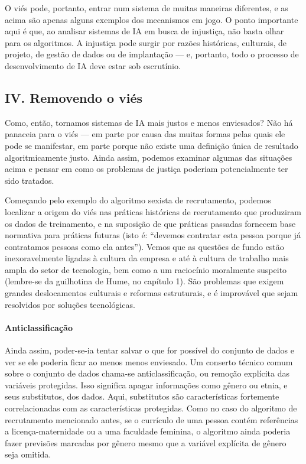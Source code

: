 \documentclass[
  11pt,
]{article}
\begin{document}
O viés pode, portanto, entrar num sistema de muitas maneiras diferentes,
e as acima são apenas alguns exemplos dos mecanismos em jogo. O ponto
importante aqui é que, ao analisar sistemas de IA em busca de injustiça,
não basta olhar para os algoritmos. A injustiça pode surgir por razões
históricas, culturais, de projeto, de gestão de dados ou de implantação
--- e, portanto, todo o processo de desenvolvimento de IA deve estar sob
escrutínio.

\subsection{IV. Removendo o viés}\label{iv.-removendo-o-viuxe9s}

Como, então, tornamos sistemas de IA mais justos e menos enviesados? Não
há panaceia para o viés --- em parte por causa das muitas formas pelas
quais ele pode se manifestar, em parte porque não existe uma definição
única de resultado algoritmicamente justo. Ainda assim, podemos examinar
algumas das situações acima e pensar em como os problemas de justiça
poderiam potencialmente ter sido tratados.

Começando pelo exemplo do algoritmo sexista de recrutamento, podemos
localizar a origem do viés nas práticas históricas de recrutamento que
produziram os dados de treinamento, e na suposição de que práticas
passadas fornecem base normativa para práticas futuras (isto é:
``devemos contratar esta pessoa porque já contratamos pessoas como ela
antes''). Vemos que as questões de fundo estão inexoravelmente ligadas à
cultura da empresa e até à cultura de trabalho mais ampla do setor de
tecnologia, bem como a um raciocínio moralmente suspeito (lembre-se da
guilhotina de Hume, no capítulo 1). São problemas que exigem grandes
deslocamentos culturais e reformas estruturais, e é improvável que sejam
resolvidos por soluções tecnológicas.

\paragraph{Anticlassificação}\label{anticlassificauxe7uxe3o}

Ainda assim, poder-se-ia tentar salvar o que for possível do conjunto de
dados e ver se ele poderia ficar ao menos menos enviesado. Um conserto
técnico comum sobre o conjunto de dados chama-se anticlassificação, ou
remoção explícita das variáveis protegidas. Isso significa apagar
informações como gênero ou etnia, e seus substitutos, dos dados. Aqui,
substitutos são características fortemente correlacionadas com as
características protegidas. Como no caso do algoritmo de recrutamento
mencionado antes, se o currículo de uma pessoa contém referências a
licença-maternidade ou a uma faculdade feminina, o algoritmo ainda
poderia fazer previsões marcadas por gênero mesmo que a variável
explícita de gênero seja omitida.
\end{document}
